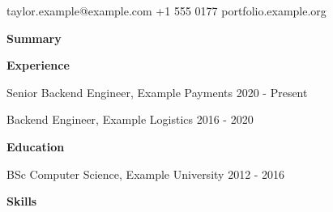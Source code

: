 \documentclass[10pt]{article}
\begin{document}
{\LARGE \Person}\par taylor.example@example.com \quad +1 555 0177 \quad portfolio.example.org\par\bigskip
\textbf{Summary}\par \Summary\par\medskip
\textbf{Experience}\par
Senior Backend Engineer, Example Payments \hfill 2020 - Present\par \JobA\par \JobB\par\medskip
Backend Engineer, Example Logistics \hfill 2016 - 2020\par \JobC\par\medskip
\textbf{Education}\par BSc Computer Science, Example University \hfill 2012 - 2016\par\medskip
\textbf{Skills}\par \SkillsLine\par
\end{document}
